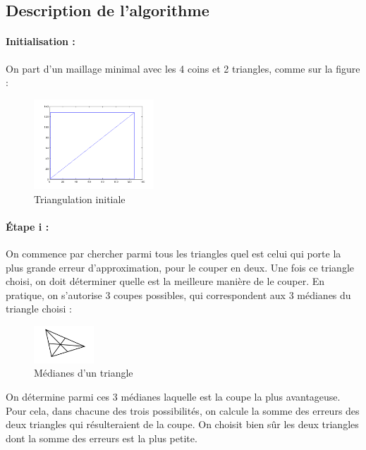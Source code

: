 \documentclass{report}
\begin{document}
\subsection{Description de l'algorithme}

\paragraph{Initialisation :}

On part d'un maillage minimal avec les 4 coins et 2 triangles, comme sur la figure :

\begin{figure}[ht]
\centering
\includegraphics[width=0.4\textwidth]{beginBissect.png}
\caption{Triangulation initiale}
\end{figure}

\paragraph{Étape i :}

On commence par chercher parmi tous les triangles quel est celui qui porte la plus grande erreur d'approximation, pour le couper en deux. Une fois ce triangle choisi, on doit déterminer quelle est la meilleure manière de le couper. En pratique, on s'autorise 3 coupes possibles, qui correspondent aux 3 médianes du triangle choisi :

\begin{figure}[ht]
\centering
\includegraphics[width=0.2\textwidth]{triangle.png}
\caption{Médianes d'un triangle}
\end{figure}

On détermine parmi ces 3 médianes laquelle est la coupe la plus avantageuse. Pour cela, dans chacune des trois possibilités, on calcule la somme des erreurs des deux triangles qui résulteraient de la coupe. On choisit bien sûr les deux triangles dont la somme des erreurs est la plus petite.
\end{document}
